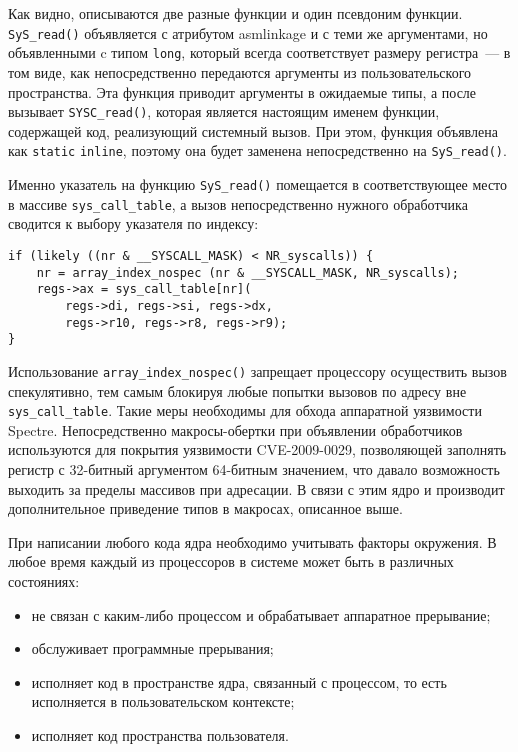 Как видно, описываются две разные функции и один псевдоним функции.
\texttt{SyS\_read()} объявляется с атрибутом asmlinkage и с теми же аргументами,
но объявленными c типом \texttt{long}, который всегда соответствует размеру
регистра~--- в том виде, как непосредственно передаются аргументы из
пользовательского пространства. Эта функция приводит аргументы в ожидаемые типы,
а после вызывает \texttt{SYSC\_read()}, которая является настоящим именем
функции, содержащей код, реализующий системный вызов. При этом, функция
объявлена как \texttt{static} \texttt{inline}, поэтому она будет заменена
непосредственно на \texttt{SyS\_read()}.

Именно указатель на функцию \texttt{SyS\_read()} помещается в соответствующее
место в массиве \texttt{sys\_call\_table}, а вызов непосредственно нужного
обработчика сводится к выбору указателя по индексу:
\medskip
\begin{lstlisting}[style=cstyle]
if (likely ((nr & __SYSCALL_MASK) < NR_syscalls)) {
	nr = array_index_nospec (nr & __SYSCALL_MASK, NR_syscalls);
	regs->ax = sys_call_table[nr](
		regs->di, regs->si, regs->dx,
		regs->r10, regs->r8, regs->r9);
}
\end{lstlisting}
\medskip

Использование \texttt{array\_index\_nospec()} запрещает процессору осуществить
вызов спекулятивно, тем самым блокируя любые попытки вызовов по адресу вне
\texttt{sys\_call\_table}. Такие меры необходимы для обхода аппаратной
уязвимости Spectre. Непосредственно макросы-обертки при объявлении обработчиков
используются для покрытия уязвимости CVE-2009-0029, позволяющей заполнять
регистр с 32-битный аргументом 64-битным значением, что давало возможность
выходить за пределы массивов при адресации. В связи с этим ядро и производит
дополнительное приведение типов в макросах, описанное выше.

При написании любого кода ядра необходимо учитывать факторы окружения. В любое
время каждый из процессоров в системе может быть в различных состояниях:
\begin{itemize}
\item не связан с каким-либо процессом и обрабатывает аппаратное прерывание;
\item обслуживает программные прерывания;
\item исполняет код в пространстве ядра, связанный с процессом, то есть
  исполняется в пользовательском контексте;
\item исполняет код пространства пользователя.
\end{itemize}

